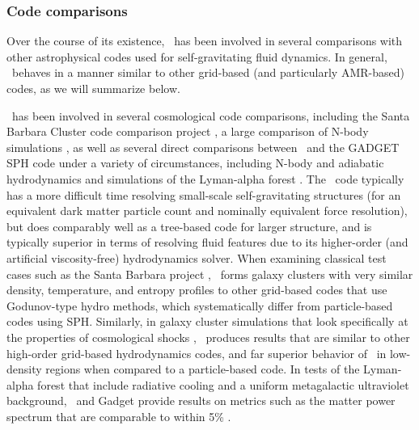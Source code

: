 \subsubsection{Code comparisons}
\label{sec.tests.compare}

Over the course of its existence, \enzo\ has been involved in several
comparisons with other astrophysical codes used for self-gravitating
fluid dynamics.  In general, \enzo\ behaves in a manner similar to other
grid-based (and particularly AMR-based) codes, as we will summarize below.

\enzo\ has been involved in several cosmological code comparisons,
including the Santa Barbara Cluster code comparison project
\citep{SantaBarbara}, a large comparison of N-body simulations
\citep{2008CS&D....1a5003H}, as well as several direct comparisons
between \enzo\ and the GADGET SPH code under a variety of
circumstances, including N-body and adiabatic hydrodynamics
\citep{2005ApJS..160....1O,2005MNRAS.364..909V, 2011MNRAS.418..960V}
and simulations of the Lyman-alpha forest \citep{2007MNRAS.374..196R}.
The \enzo\ code typically has a more difficult time resolving
small-scale self-gravitating structures (for an equivalent dark matter
particle count and nominally equivalent force resolution), but does
comparably well as a tree-based code for larger structure, and is
typically superior in terms of resolving fluid features due to its
higher-order (and artificial viscosity-free) hydrodynamics solver.
When examining classical test cases such as the Santa Barbara
project \citep{SantaBarbara}, \enzo\ forms galaxy clusters with very similar density,
temperature, and entropy profiles to other grid-based codes that use
Godunov-type hydro methods, which
systematically differ from particle-based codes using SPH.  Similarly,
in galaxy cluster simulations that look specifically at the properties
of cosmological shocks \citep[e.g.][]{2011MNRAS.418..960V}, \enzo\
produces results that are similar to other high-order grid-based
hydrodynamics codes, and far superior behavior of \enzo\ in
low-density regions when compared to a particle-based code.  In tests
of the Lyman-alpha forest that include radiative cooling and a uniform
metagalactic ultraviolet background, \enzo\ and Gadget provide results
on metrics such as the matter power spectrum that are comparable to
within 5\% \citep{2007MNRAS.374..196R}.

